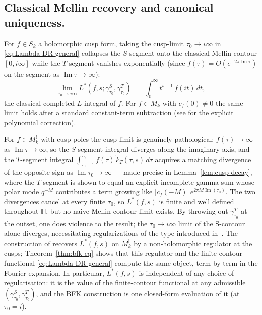 \documentclass[11pt]{article}
\numberwithin{equation}{section}  %
\newcommand{\HH}{\mathbb{H}}
\DeclareMathOperator{\im}{Im}
\begin{document}
\subsection{Classical Mellin recovery and canonical uniqueness.}\label{sec:Connection-w-previous-weak-MF-l-functions}
For $f \in S_k$ a holomorphic cusp form, taking the cusp-limit
$\tau_0 \to i\infty$ in \eqref{eq:Lambda-DR-general} collapses the
$S$-segment onto the classical Mellin contour $[0, i\infty]$ while
the $T$-segment vanishes exponentially (since $f(\tau) =
O(e^{-2\pi\im\tau})$ on the segment as $\im\tau \to \infty$):
\begin{equation}\label{eq:Mellin-recovery}
  \lim_{\tau_0 \to i\infty}\!
  L^*(f, s; \gamma^S_{\tau_0}, \gamma^T_{\tau_0})
  \;=\; \int_0^\infty\! t^{s - 1}\,f(it)\,dt,
\end{equation}
the classical completed $L$-integral of $f$.  For $f \in M_k$ with
$c_f(0) \ne 0$ the same limit holds after a standard constant-term
subtraction (see \cite[Lemma~2.1]{1806} for the explicit polynomial
correction).

For $f \in M^!_k$ with cusp poles the cusp-limit is genuinely
pathological: $f(\tau) \to \infty$ as $\im\tau \to \infty$, so the
$S$-segment integral diverges along the imaginary axis, and the
$T$-segment integral $\int_{\tau_0 - 1}^{\tau_0}\! f(\tau)\,
\widetilde{k}_T(\tau, s)\,d\tau$ acquires a matching divergence of
the opposite sign as $\im\tau_0 \to \infty$ --- made precise in
Lemma~\ref{lem:cusp-decay}, where the $T$-segment is shown to equal an
explicit incomplete-gamma sum whose polar mode $q^{-M}$ contributes a
term growing like $|c_f(-M)|\,e^{2\pi M \im(\tau_0)}$.
The two divergences cancel at every finite $\tau_0$, so $L^*(f, s)$
is finite and well defined throughout $\HH$, but no naive Mellin
contour limit exists. By throwing-out $\gamma^T_{\tau_0}$ at the outset, 
one does violence to the result; the $\tau_0 \to i \infty$ limit of the S-contour 
alone diverges, necessitating regularizations of the type introduced in~\cite{BFK2011}. 
The construction of \cite{BFK2011} recovers
$L^*(f, s)$ on $M^!_k$ by a non-holomorphic regulator at the cusps;
Theorem~\ref{thm:bfk-eq} shows that this regulator and the
finite-contour functional \eqref{eq:Lambda-DR-general} compute the
same object, term by term in the Fourier expansion.  In particular,
$L^*(f, s)$ is independent of any choice of regularisation: it is
the value of the finite-contour functional at any admissible
$(\gamma^S_{\tau_0}, \gamma^T_{\tau_0})$, and the BFK construction is
one closed-form evaluation of it (at $\tau_0 = i$).
\end{document}
